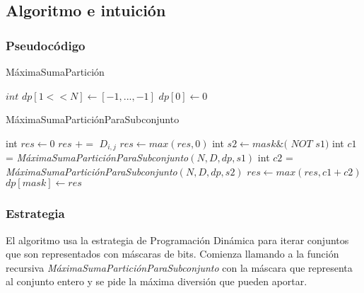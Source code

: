 \subsection{Algoritmo e intuición}

\subsubsection*{Pseudocódigo}

\begin{algorithm}[H]
    \caption{MáximaSumaPartición}
    $int$  $\mathit{dp[1<<N]} \gets [-1,...,-1]$ \;
    $\mathit{dp[0]} \gets 0$ \;
\end{algorithm}

\begin{algorithm}[H]
    \caption{MáximaSumaParticiónParaSubconjunto}
     {
    }{
    int $\mathit{res} \gets 0$ \;
     {
         {
             {
                $res$ $+=$ $D_{i,j}$
            }
        }
    }
    $res \gets max(res, 0)$ \;
     {
        int $s2 \gets mask \& ($ $NOT$ $ s1)$ \;
        int $c1$ = \emph{MáximaSumaParticiónParaSubconjunto}$(N, D, dp, s1)$ \;
        int $c2$ = \emph{MáximaSumaParticiónParaSubconjunto}$(N, D, dp, s2)$ \;
        $res \gets max(res, c1+c2)$ \;
    }
    $dp[mask] \gets res$ \;
    }
\end{algorithm}
\bigskip

\subsubsection*{Estrategia}

El algoritmo usa la estrategia de Programación Dinámica para iterar
conjuntos que son representados con máscaras de bits. Comienza llamando a la
función recursiva \emph{MáximaSumaParticiónParaSubconjunto} con la máscara que
representa al conjunto entero y se pide la máxima diversión que pueden
aportar.


